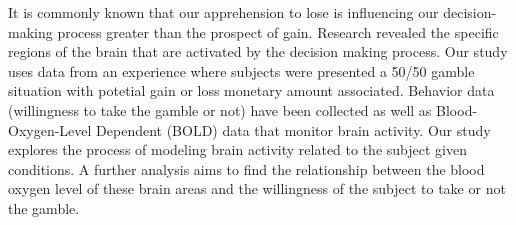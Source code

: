 \noindent
It is commonly known that our apprehension to lose is influencing our decision-making
process greater than the prospect of gain. Research revealed the specific regions of
the brain that are activated by the decision making process. Our study uses data from
an experience where subjects were presented a 50/50 gamble situation with potetial 
gain or loss monetary amount associated.
Behavior data (willingness to take the gamble or not) have been collected as well as
Blood-Oxygen-Level Dependent (BOLD) data that monitor brain activity. Our study 
explores the process of modeling brain activity related to the subject given conditions.
A further analysis aims to find the relationship between the blood oxygen level of these 
brain areas and the willingness of the subject to take or not the gamble. 

